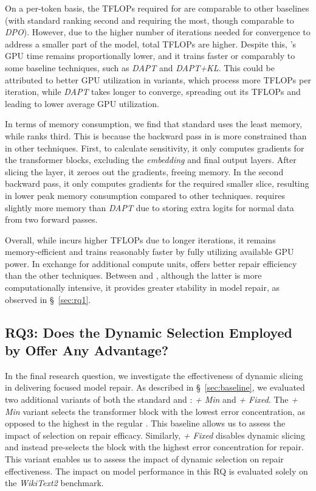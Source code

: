 On a per-token basis, the TFLOPs required for \nick are comparable to other baselines (with standard \nick ranking second and \nickkl requiring the most, though comparable to \textit{DPO}). However, due to the higher number of iterations needed for convergence to address a smaller part of the model, total TFLOPs are higher. Despite this, \nick’s GPU time remains proportionally lower, and it trains faster or comparably to some baseline techniques, such as \textit{DAPT} and \textit{DAPT+KL}. This could be attributed to better GPU utilization in \nick variants, which process more TFLOPs per iteration, while \textit{DAPT} takes longer to converge, spreading out its TFLOPs and leading to lower average GPU utilization.

In terms of memory consumption, we find that standard \nick uses the least memory, while \nickkl ranks third. This is because the backward pass in \nick is more constrained than in other techniques. First, to calculate sensitivity, it only computes gradients for the transformer blocks, excluding the \textit{embedding} and final output layers. After slicing the layer, it zeroes out the gradients, freeing memory. In the second backward pass, it only computes gradients for the required smaller slice, resulting in lower peak memory consumption compared to other techniques. \nickkl requires slightly more memory than \textit{DAPT} due to storing extra logits for normal data from two forward passes.

Overall, while \nick incurs higher TFLOPs due to longer iterations, it remains memory-efficient and trains reasonably faster by fully utilizing available GPU power. In exchange for additional compute units, \nick offers better repair efficiency than the other techniques. Between \nick and \nickkl, although the latter is more computationally intensive, it provides greater stability in model repair, as observed in \S~\ref{sec:rq1}.



\subsection{RQ3: Does the Dynamic Selection Employed by \nick Offer Any Advantage?}
\label{sec:rq3}





In the final research question, we investigate the effectiveness of dynamic slicing in delivering focused model repair. As described in \S~\ref{sec:baseline}, we evaluated two additional variants of both the standard \nick and \nickkl: \nick\textit{+ Min} and \nick\textit{+ Fixed}. The \nick\textit{+ Min} variant selects the transformer block with the lowest error concentration, as opposed to the highest in the regular \nick. This baseline allows us to assess the impact of selection on repair efficacy. Similarly, \nick\textit{+ Fixed} disables dynamic slicing and instead pre-selects the block with the highest error concentration for repair. This variant enables us to assess the impact of dynamic selection on repair effectiveness. The impact on model performance in this RQ is evaluated solely on the \textit{WikiText2} benchmark.

